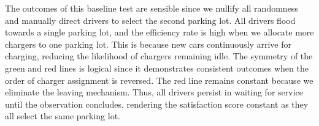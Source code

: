 The outcomes of this baseline test are sensible since we nullify all randomness and manually direct drivers to select the second parking lot. All drivers flood towards a single parking lot, and the efficiency rate is high when we allocate more chargers to one parking lot. This is because new cars continuously arrive for charging, reducing the likelihood of chargers remaining idle. The symmetry of the green and red lines is logical since it demonstrates consistent outcomes when the order of charger assignment is reversed. The red line remains constant because we eliminate the leaving mechanism. Thus, all drivers persist in waiting for service until the observation concludes, rendering the satisfaction score constant as they all select the same parking lot.

